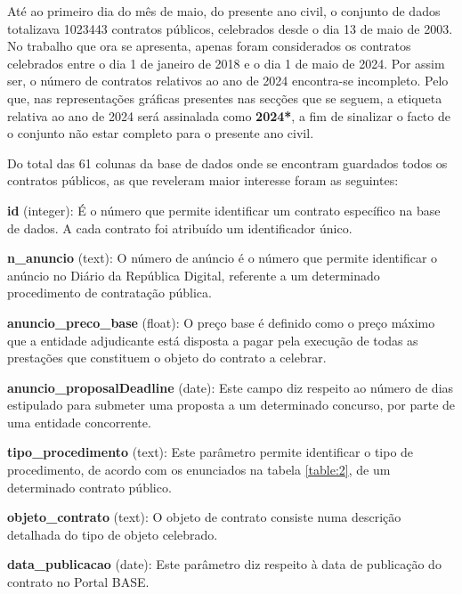 Até ao primeiro dia do mês de maio, do presente ano civil, o conjunto de dados totalizava 1023443 contratos públicos, celebrados desde o dia 13 de maio de 2003. No trabalho que ora se apresenta, apenas foram considerados os contratos celebrados entre o dia 1 de janeiro de 2018 e o dia 1 de maio de 2024. Por assim ser, o número de contratos relativos ao ano de 2024 encontra-se incompleto. Pelo que, nas representações gráficas presentes nas secções que se seguem, a etiqueta relativa ao ano de 2024 será assinalada como \textbf{2024*}, a fim de sinalizar o facto de o conjunto não estar completo para o presente ano civil. 

Do total das 61 colunas da base de dados onde se encontram guardados todos os contratos públicos, as que reveleram maior interesse foram as seguintes: 


\begin{my_itemize}
	

\item \textbf{id} (integer): É o número que permite identificar um contrato específico na base de dados. A cada contrato foi atribuído um identificador único.


\item \textbf{n\_anuncio} (text): O número de anúncio é o número que permite identificar o anúncio no Diário da República Digital, referente a um determinado procedimento de contratação pública.


\item \textbf{anuncio\_preco\_base} (float): O preço base é definido como o preço máximo que a entidade adjudicante está disposta a pagar pela execução de todas as prestações que constituem o objeto do contrato a celebrar.


\item \textbf{anuncio\_proposalDeadline} (date): Este campo diz respeito ao número de dias estipulado para submeter uma proposta a um determinado concurso, por parte de uma entidade concorrente. 


\item \textbf{tipo\_procedimento} (text): Este parâmetro permite identificar o tipo de procedimento, de acordo com os enunciados na tabela \ref{table:2}, de um  determinado contrato público.


\item \textbf{objeto\_contrato} (text): O objeto de contrato consiste numa descrição detalhada do tipo de objeto celebrado. 


\item \textbf{data\_publicacao} (date): Este parâmetro diz respeito à data de publicação do contrato no Portal BASE.



\end{my_itemize}

